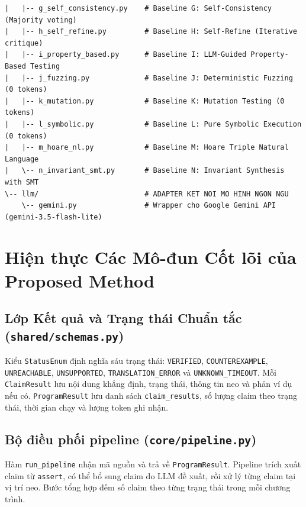\begin{center}
\begin{minipage}{0.96\textwidth}
\begin{verbatim}
|   |-- g_self_consistency.py    # Baseline G: Self-Consistency (Majority voting)
|   |-- h_self_refine.py         # Baseline H: Self-Refine (Iterative critique)
|   |-- i_property_based.py      # Baseline I: LLM-Guided Property-Based Testing
|   |-- j_fuzzing.py             # Baseline J: Deterministic Fuzzing (0 tokens)
|   |-- k_mutation.py            # Baseline K: Mutation Testing (0 tokens)
|   |-- l_symbolic.py            # Baseline L: Pure Symbolic Execution (0 tokens)
|   |-- m_hoare_nl.py            # Baseline M: Hoare Triple Natural Language
|   \-- n_invariant_smt.py       # Baseline N: Invariant Synthesis with SMT
\-- llm/                         # ADAPTER KET NOI MO HINH NGON NGU
    \-- gemini.py                # Wrapper cho Google Gemini API (gemini-3.5-flash-lite)
\end{verbatim}
\vspace{-6pt}
\label{fig:package_structure}
\end{minipage}
\end{center}

\section{Hiện thực Các Mô-đun Cốt lõi của Proposed Method}
\label{sec:core_modules_implementation}

\subsection{Lớp Kết quả và Trạng thái Chuẩn tắc (\texttt{shared/schemas.py})}
Kiểu \texttt{StatusEnum} định nghĩa sáu trạng thái: \texttt{VERIFIED}, \texttt{COUNTEREXAMPLE}, \texttt{UNREACHABLE}, \texttt{UNSUPPORTED}, \texttt{TRANSLATION\_ERROR} và \texttt{UNKNOWN\_TIMEOUT}. Mỗi \texttt{ClaimResult} lưu nội dung khẳng định, trạng thái, thông tin neo và phản ví dụ nếu có. \texttt{ProgramResult} lưu danh sách \texttt{claim\_results}, số lượng claim theo trạng thái, thời gian chạy và lượng token ghi nhận.

\subsection{Bộ điều phối pipeline (\texttt{core/pipeline.py})}
Hàm \texttt{run\_pipeline} nhận mã nguồn và trả về \texttt{ProgramResult}. Pipeline trích xuất claim từ \texttt{assert}, có thể bổ sung claim do LLM đề xuất, rồi xử lý từng claim tại vị trí neo. Bước tổng hợp đếm số claim theo từng trạng thái trong mỗi chương trình.

